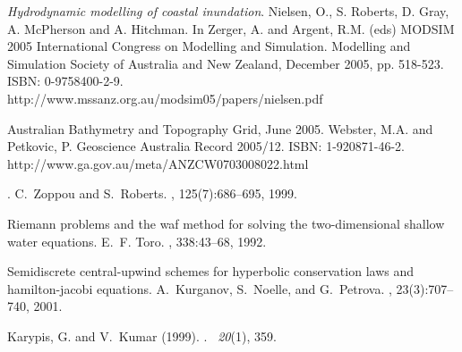 \documentclass{manual}
\begin{document}

%
%
%




\begin{thebibliography}{99}
{\it Hydrodynamic modelling of coastal inundation}.
Nielsen, O., S. Roberts, D. Gray, A. McPherson and A. Hitchman.
In Zerger, A. and Argent, R.M. (eds) MODSIM 2005 International Congress on
Modelling and Simulation. Modelling and Simulation Society of Australia and
New Zealand, December 2005, pp. 518-523. ISBN: 0-9758400-2-9.\\
http://www.mssanz.org.au/modsim05/papers/nielsen.pdf

Australian Bathymetry and Topography Grid, June 2005.
Webster, M.A. and Petkovic, P.
Geoscience Australia Record 2005/12. ISBN: 1-920871-46-2.\\
http://www.ga.gov.au/meta/ANZCW0703008022.html

.
\newblock C.~Zoppou and S.~Roberts.
, 125(7):686--695, 1999.

\newblock Riemann problems and the waf method for solving the two-dimensional
  shallow water equations.
\newblock E.~F. Toro.
,
  338:43--68, 1992.

\newblock Semidiscrete central-upwind schemes for hyperbolic conservation laws
  and hamilton-jacobi equations.
\newblock A.~Kurganov, S.~Noelle, and G.~Petrova.
, 23(3):707--740, 2001.


Karypis, G. and V.~Kumar (1999).
.
~{\em 20\/}(1), 359.


\end{thebibliography}
\end{document}
